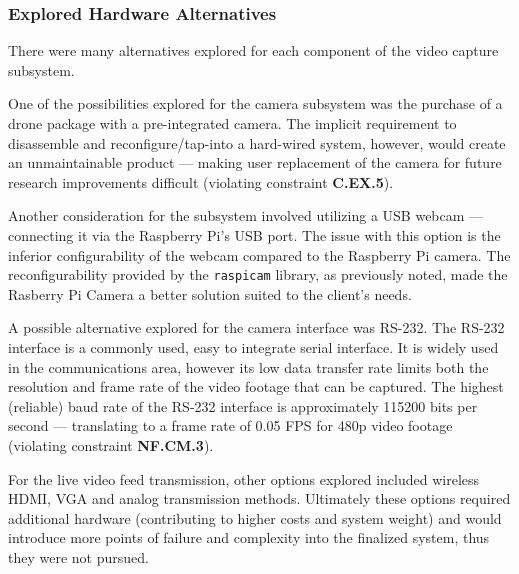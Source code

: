 \subsubsection{Explored Hardware Alternatives}
There were many alternatives explored for each component of the video capture subsystem.

One of the possibilities explored for the camera subsystem was the purchase of a drone package with a pre-integrated camera. The implicit requirement to disassemble and reconfigure/tap-into a hard-wired system, however, would create an unmaintainable product --- making user replacement of the camera for future research improvements difficult (violating constraint \textbf{C.EX.5}).

Another consideration for the subsystem involved utilizing a USB webcam --- connecting it via the Raspberry Pi's USB port. The issue with this option is the inferior configurability of the webcam compared to the Raspberry Pi camera. The reconfigurability provided by the \texttt{raspicam} library, as previously noted, made the Rasberry Pi Camera a better solution suited to the client's needs.

A possible alternative explored for the camera interface was RS-232. The RS-232 interface is a commonly used, easy to integrate serial interface. It is widely used in the communications area, however its low data transfer rate limits both the resolution and frame rate of the video footage that can be captured. The highest (reliable) baud rate of the RS-232 interface is approximately 115200 bits per second --- translating to a frame rate of 0.05 FPS for 480p video footage (violating constraint \textbf{NF.CM.3}).

For the live video feed transmission, other options explored included wireless HDMI, VGA and analog transmission methods.  Ultimately these options required additional hardware (contributing to higher costs and system weight) and would introduce more points of failure and complexity into the finalized system, thus they were not pursued.
